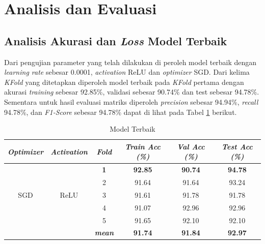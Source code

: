 \section{Analisis dan Evaluasi}
    \subsection{Analisis Akurasi dan \textit{Loss} Model Terbaik}

    Dari pengujian parameter yang telah dilakukan di peroleh model terbaik 
    dengan \textit{learning rate} sebesar 0.0001, \textit{activation} ReLU 
    dan \textit{optimizer} SGD. Dari kelima \textit{KFold} yang ditetapkan 
    diperoleh model terbaik pada \textit{KFold} pertama dengan 
    akurasi \textit{training} sebesar 92.85\%, validasi sebesar 
    90.74\% dan test sebesar 94.78\%. Sementara untuk hasil evaluasi 
    matriks diperoleh \textit{precision} sebesar 94.94\%, \textit{recall} 
     94.78\%, dan \textit{F1-Score} sebesar 94.78\% dapat di 
     lihat pada Tabel \ref{Model Terbaik} berikut.

    \begin{table}[H]
        \centering
        \caption{Model Terbaik}
        \begin{tabular}{cccccc}
            \toprule
            \textbf{\textit{Optimizer}} & \textbf{\textit{Activation}} &
            \multicolumn{1}{c}{\textit{\textbf{Fold}}} & \textbf{\textit{Train Acc (\%) } } & \textbf{\textit{Val Acc (\%)}} & \textbf{\textit{Test Acc (\%)}}\\
        
            \midrule
            \multirow{5}{*}{SGD} & \multirow{5}{*}{ReLU} 
            & \textbf{1} & \textbf{92.85 }& \textbf{90.74 }& \textbf{94.78} \\
            & & 2 & 91.64 & 91.64 & 93.24 \\
            & & 3 & 91.61 & 91.78 & 91.78 \\
            & & 4 & 91.07 & 92.96 & 92.96 \\
            & & 5 & 91.65 & 92.10 & 92.10  \\
            & &\multirow{1}{*}{\textit{\textbf{mean}}} & \textbf{91.74} & \textbf{91.84} &\textbf{92.97} \\ 
            \bottomrule
        \end{tabular}
        \label{Model Terbaik}
    \end{table}


